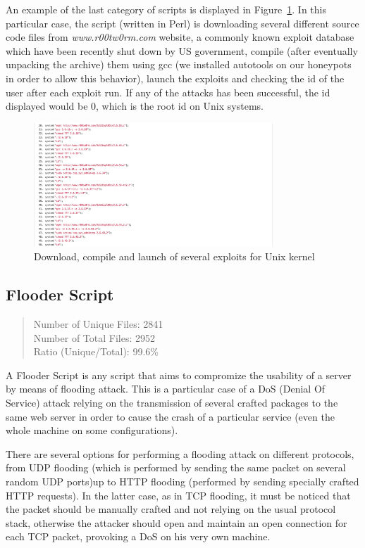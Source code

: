 An example of the last category of scripts is displayed in Figure~\ref{fig:localExploit}. In this particular case, the script (written in Perl) is downloading several different source code files from \emph{www.r00tw0rm.com} website, a commonly known exploit database which have been recently shut down by US government, compile (after eventually unpacking the archive) them using gcc (we installed autotools on our honeypots in order to allow this behavior), launch the exploits and checking the id of the user after each exploit run. If any of the attacks has been successful, the id displayed would be 0, which is the root id on Unix systems.

\begin{figure}[H]
\centerline{\includegraphics[width=0.8\textwidth]{Images/localExploit.jpg}}
\caption{Download, compile and launch of several exploits for Unix kernel\label{fig:localExploit}}
\end{figure}

\subsection{Flooder Script}

\begin{quote}
Number of Unique Files: 2841\\
Number of Total Files: 2952\\
Ratio (Unique/Total): 99.6\%
\end{quote}

A Flooder Script is any script that aims to compromize the usability of a server by means of flooding attack. This is a particular case of a DoS (Denial Of Service) attack relying on the transmission of several crafted packages to the same web server in order to cause the crash of a particular service (even the whole machine on some configurations).

There are several options for performing a flooding attack on different protocols, from UDP flooding (which is performed by sending the same packet on several random UDP ports)up to HTTP flooding (performed by sending specially crafted HTTP requests). In the latter case, as in TCP flooding, it must be noticed that the packet should be manually crafted and not relying on the usual protocol stack, otherwise the attacker should open and maintain an open connection for each TCP packet, provoking a DoS on his very own machine.


